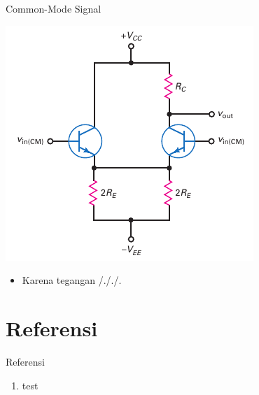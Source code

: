\documentclass[aspectratio=169]{beamer}
\begin{document}
\begin{frame}{Common-Mode Signal}
	\begin{multicols}{2}
		\begin{center}
			\includegraphics[height=0.7\textheight]{gambar/01.diff-amp/01.equivalent_circuit_commonmode}
		\end{center}
		\columnbreak
		\begin{itemize}
			\item Karena tegangan /././.
		\end{itemize}
	\end{multicols}
\end{frame}


\section{Referensi}
\begin{frame}{Referensi}
	\begin{enumerate}
		\item test
	\end{enumerate}
\end{frame}
\end{document}
